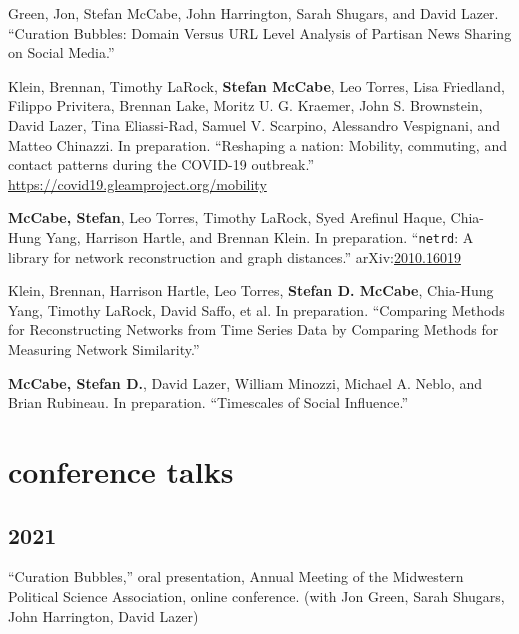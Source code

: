 \documentclass[11pt, letter]{article}
\begin{document}
\begin{hangparas}{.25in}{1}
Green, Jon, Stefan McCabe, John Harrington, Sarah Shugars, and David Lazer. ``Curation Bubbles: Domain Versus URL Level Analysis of Partisan News Sharing on Social Media.''\vspace{2mm}

Klein, Brennan,\textsuperscript{\textdagger}  Timothy LaRock,\textsuperscript{\textdagger}  \textbf{Stefan McCabe},\textsuperscript{\textdagger}  Leo Torres,\textsuperscript{\textdagger}  Lisa Friedland, Filippo Privitera, Brennan Lake, Moritz U. G. Kraemer, John S. Brownstein, David Lazer, Tina Eliassi-Rad, Samuel V. Scarpino, Alessandro Vespignani, and Matteo Chinazzi. In preparation. ``Reshaping a nation: Mobility, commuting, and contact patterns during the COVID-19 outbreak.'' \href{https://covid19.gleamproject.org/mobility}{https://covid19.gleamproject.org/mobility} \vspace{2mm}

\textbf{McCabe, Stefan}, Leo Torres, Timothy LaRock, Syed Arefinul Haque, Chia-Hung Yang, Harrison Hartle, and Brennan Klein. In preparation. ``\texttt{netrd}: A library for network reconstruction and graph distances.'' arXiv:\href{https://arxiv.org/abs/2010.16019}{2010.16019}\vspace{2mm}

Klein, Brennan, Harrison Hartle, Leo Torres, \textbf{Stefan D. McCabe}, Chia-Hung Yang, Timothy LaRock, David Saffo, et al. In preparation. ``Comparing Methods for Reconstructing Networks from Time Series Data by Comparing Methods for Measuring Network Similarity.''\vspace{2mm}

\textbf{McCabe, Stefan D.}, David Lazer, William Minozzi, Michael A. Neblo, and Brian Rubineau. In preparation. ``Timescales of Social Influence.''\vspace{2mm}
\vspace{2mm}

\end{hangparas}
\section{conference talks}

\subsection{2021}

\begin{hangparas}{.25in}{1}
``Curation Bubbles,'' oral presentation, Annual Meeting of the Midwestern Political Science Association, online conference. (with Jon Green, Sarah Shugars, John Harrington, David Lazer)

\end{hangparas}
\end{document}
